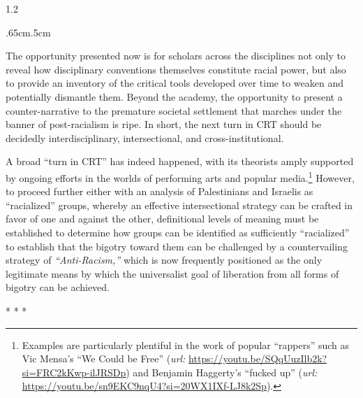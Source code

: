 \documentclass[../unravbook.tex]{subfiles}
\begin{document}
\begin{spacing}{1.2}
\begin{adjustwidth}{.65cm}{.5cm}
    \begin{singlespace}
    The opportunity presented now is for scholars across the disciplines not only to reveal how disciplinary conventions themselves constitute racial power, but also to provide an inventory of the critical tools developed over time to weaken and potentially dismantle them. Beyond the academy, the opportunity to present a counter-narrative to the premature societal settlement that marches under the banner of post-racialism is ripe. In short, the next turn in CRT should be decidedly interdisciplinary, intersectional, and cross-institutional.
\end{singlespace}
\end{adjustwidth}

\noindent
A broad ``turn in CRT'' has indeed happened, with its theorists amply supported by ongoing efforts in the worlds of performing arts and popular media.\footnote{Examples are particularly plentiful in the work of popular ``rappers'' such as Vic Mensa's ``We Could be Free'' (\textit{url: } \url{https://youtu.be/SQqUuzIlb2k?si=FRC2kKwp-ilJRSDp}) and Benjamin Haggerty's ``fucked up'' (\textit{url: } \url{https://youtu.be/sn9EKC9nqU4?si=20WX1IXf-LJ8k2Sp}).} However, to proceed further either with an analysis of Palestinians and Israelis as ``racialized'' groups, whereby an effective intersectional strategy can be crafted in favor of one and against the other, definitional levels of meaning must be established to determine how groups can be identified as sufficiently ``racialized'' to establish that the bigotry toward them can be challenged by a countervailing strategy of \textit{``Anti-Racism,''} which is now frequently positioned as the only legitimate means by which the universalist goal of liberation from all forms of bigotry can be achieved.

\begin{center}
    *\hspace{15pt} *\hspace{15pt} *
  \end{center}


\end{spacing}
\end{document}
